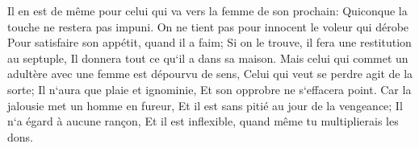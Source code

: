 \verse Il en est de même pour celui qui va vers la femme de son prochain: Quiconque la touche ne restera pas impuni. 
\verse On ne tient pas pour innocent le voleur qui dérobe Pour satisfaire son appétit, quand il a faim; 
\verse Si on le trouve, il fera une restitution au septuple, Il donnera tout ce qu`il a dans sa maison. 
\verse Mais celui qui commet un adultère avec une femme est dépourvu de sens, Celui qui veut se perdre agit de la sorte; 
\verse Il n`aura que plaie et ignominie, Et son opprobre ne s`effacera point. 
\verse Car la jalousie met un homme en fureur, Et il est sans pitié au jour de la vengeance; 
\verse Il n`a égard à aucune rançon, Et il est inflexible, quand même tu multiplierais les dons. 

\chapter{}

